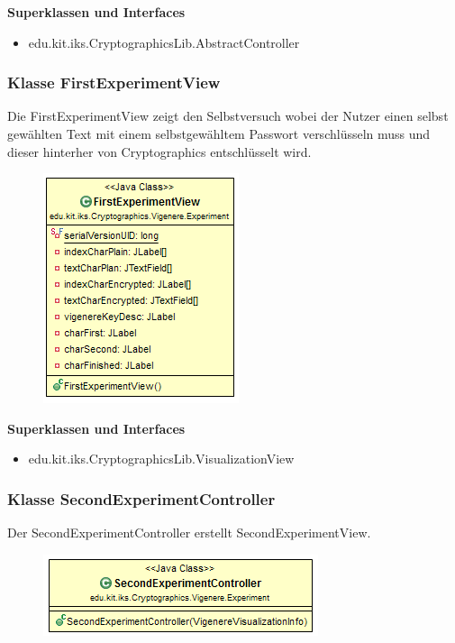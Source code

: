 \documentclass{article}
\begin{document}
      \textbf{Superklassen und Interfaces}
      \begin{itemize}
        \item edu.kit.iks.CryptographicsLib.AbstractController
      \end{itemize}

    \subsubsection{Klasse FirstExperimentView}
      Die FirstExperimentView zeigt den Selbstversuch wobei der Nutzer einen selbst gewählten Text mit einem selbstgewähltem Passwort verschlüsseln muss und dieser hinterher von Cryptographics entschlüsselt wird.
      \begin{figure}[H]
        \centering
        \includegraphics{resources/edu-kit-iks-Cryptographics-Vigenere-FirstExperimentView}
      \end{figure}

      \textbf{Superklassen und Interfaces}
      \begin{itemize}
        \item edu.kit.iks.CryptographicsLib.VisualizationView
      \end{itemize}

    \subsubsection{Klasse SecondExperimentController}
      Der SecondExperimentController erstellt SecondExperimentView.
      \begin{figure}[H]
        \centering
        \includegraphics{resources/edu-kit-iks-Cryptographics-Vigenere-SecondExperimentController}
      \end{figure}
\end{document}
